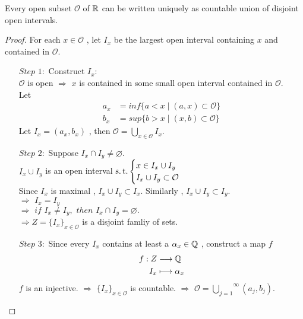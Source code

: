 	\vspace*{2em}
	\begin{thm}\label{thm 1.1.3}
		Every open subset $\mathcal{O}$ of $\mathbb{R}$ can be written uniquely as countable union of disjoint open intervals.
		
		\begin{proof}
			For each $x \in \mathcal{O}$ , let $I_x$ be the largest open interval containing $x$ and contained in $\mathcal{O}$.
			\begin{enumerate}
				\item[$Step \,\, 1 :$]Construct $I_x$:\\
				$\mathcal{O}$ is open $\Rightarrow$ $x$ is contained in some small open interval contained in $\mathcal{O}$.\\
				Let 
				\begin{align}
					a_x &= inf\{ a < x \mid (a , x) \subset \mathcal{O} \} \\
					b_x &= sup\{ b > x \mid (x , b) \subset \mathcal{O} \}
				\end{align}
				Let $I_x = (a_x , b_x)$ , then $\mathcal{O} = \underset{x \in \mathcal{O}}{\bigcup}{I_x}$.
				
				\item[$Step \,\, 2 :$]Suppose $I_x \cap I_y \neq \varnothing$.\\
				$I_x \cup I_y$ is an open interval $\operatorname{s.t.} 
				\begin{cases}
					x \in I_x \cup I_y \\
					I_x \cup I_y \subset \mathcal{O}
				\end{cases}$\\
				Since $I_x$ is maximal , $I_x \cup I_y \subset I_x$. Similarly , $I_x \cup I_y \subset I_y$.\\
				$\Rightarrow \,\, I_x = I_y$ \\
				$\Rightarrow \,\, if \,\, I_x \neq I_y , \,\, then \,\, I_x \cap I_y = \varnothing.$\\
				$\Rightarrow Z = \{ I_x \}_{x \in \mathcal{O}}$ is a disjoint famliy of sets.
				
				\item[$Step \,\, 3 :$]Since every $I_x$ contains at least a $\alpha_x \in \mathbb{Q}$ , construct a map $f$
				\begin{align}
					f : Z &\longrightarrow \mathbb{Q} \\
					I_x &\longmapsto \alpha_x
				\end{align}
				$f$ is an injective. $\Rightarrow \,\, \{ I_x \}_{x \in \mathcal{O}}$ is countable. $\Rightarrow \,\, \mathcal{O} = \overset{\infty}{\underset{j = 1}{\bigcup}}{(a_j , b_j)}$.
			\end{enumerate}
		\end{proof}
	\end{thm}


